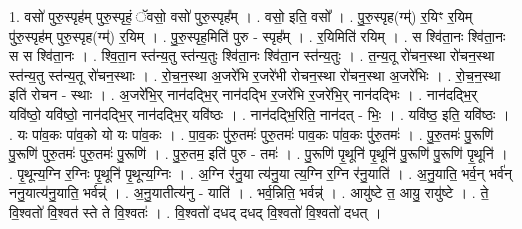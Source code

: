 \documentclass[17pt]{extarticle}
\begin{document}
1. वसो॑ पुरु॒स्पृह॑म् पुरु॒स्पृहं॒ ॅवसो॒ वसो॑ पुरु॒स्पृह᳚म् । . वसो॒ इति॒ वसो᳚ । . पु॒रु॒स्पृह(ग्म्॑) र॒यिꣳ र॒यिम् पु॑रु॒स्पृह॑म् पुरु॒स्पृह(ग्म्॑) र॒यिम् । . पु॒रु॒स्पृह॒मिति॑ पुरु - स्पृह᳚म् । . र॒यिमिति॑ रयिम् । . स श्वि॑ता॒नः श्वि॑ता॒नः स स श्वि॑ता॒नः । . श्वि॒ता॒न स्त॑न्य॒तु स्त॑न्य॒तुः श्वि॑ता॒नः श्वि॑ता॒न स्त॑न्य॒तुः । . त॒न्य॒तू रो॑चन॒स्था रो॑चन॒स्था स्त॑न्य॒तु स्त॑न्य॒तू रो॑चन॒स्थाः । . रो॒च॒न॒स्था अ॒जरे॑भि र॒जरे॑भी रोचन॒स्था रो॑चन॒स्था अ॒जरे॑भिः । . रो॒च॒न॒स्था इति॑ रोचन - स्थाः । . अ॒जरे॑भि॒र् नान॑दद्भि॒र् नान॑दद्भि र॒जरे॑भि र॒जरे॑भि॒र् नान॑दद्भिः । . नान॑दद्भि॒र् यवि॑ष्ठो॒ यवि॑ष्ठो॒ नान॑दद्भि॒र् नान॑दद्भि॒र् यवि॑ष्ठः । . नान॑दद्भि॒रिति॒ नान॑दत् - भिः॒ । . यवि॑ष्ठ॒ इति॒ यवि॑ष्ठः । . यः पा॑व॒कः पा॑व॒को यो यः पा॑व॒कः । . पा॒व॒कः पु॑रु॒तमः॑ पुरु॒तमः॑ पाव॒कः पा॑व॒कः पु॑रु॒तमः॑ । . पु॒रु॒तमः॑ पु॒रूणि॑ पु॒रूणि॑ पुरु॒तमः॑ पुरु॒तमः॑ पु॒रूणि॑ । . पु॒रु॒तम॒ इति॑ पुरु - तमः॑ । . पु॒रूणि॑ पृ॒थूनि॑ पृ॒थूनि॑ पु॒रूणि॑ पु॒रूणि॑ पृ॒थूनि॑ । . पृ॒थून्य॒ग्नि र॒ग्निः पृ॒थूनि॑ पृ॒थून्य॒ग्निः । . अ॒ग्नि र॑नु॒या त्य॑नु॒या त्य॒ग्नि र॒ग्नि र॑नु॒याति॑ । . अ॒नु॒याति॒ भर्व॒न् भर्व॑न् ननु॒यात्य॑नु॒याति॒ भर्वन्न्॑ । . अ॒नु॒यातीत्य॑नु - याति॑ । . भर्व॒न्निति॒ भर्वन्न्॑ । . आयु॑ष्टे त॒ आयु॒ रायु॑ष्टे । . ते॒ वि॒श्वतो॑ वि॒श्वत॑ स्ते ते वि॒श्वतः॑ । . वि॒श्वतो॑ दधद् दधद् वि॒श्वतो॑ वि॒श्वतो॑ दधत् । \newline
\end{document}

